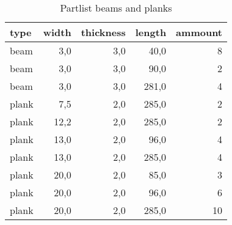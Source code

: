 \begin{table}[h!]
\centering
\caption{Partlist beams and planks}
\begin{tabular}{lrrrr}
\toprule
 type &  width &  thickness &  length &  ammount \\
\midrule
 beam &    3,0 &        3,0 &    40,0 &        8 \\
 beam &    3,0 &        3,0 &    90,0 &        2 \\
 beam &    3,0 &        3,0 &   281,0 &        4 \\
plank &    7,5 &        2,0 &   285,0 &        2 \\
plank &   12,2 &        2,0 &   285,0 &        2 \\
plank &   13,0 &        2,0 &    96,0 &        4 \\
plank &   13,0 &        2,0 &   285,0 &        4 \\
plank &   20,0 &        2,0 &    85,0 &        3 \\
plank &   20,0 &        2,0 &    96,0 &        6 \\
plank &   20,0 &        2,0 &   285,0 &       10 \\
\bottomrule
\end{tabular}
\end{table}

